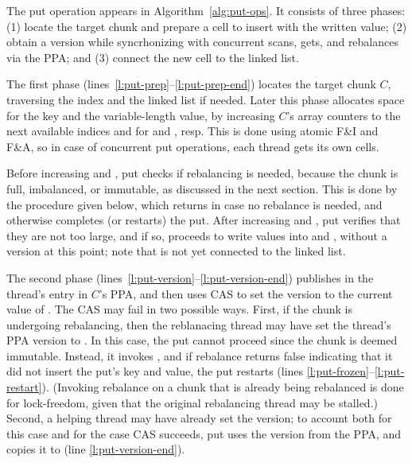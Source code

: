 The put operation appears in Algorithm~\ref{alg:put-ops}. It
consists of three phases: (1) locate the target chunk and
prepare a cell to insert with the written value; (2) obtain a version while syncrhonizing with
concurrent scans, gets, and rebalances via the PPA; and (3) connect  the new cell to the linked list.


The first phase (lines~\ref{l:put-prep}--\ref{l:put-prep-end})
locates the target chunk $C$, traversing the index and the linked list if needed. Later this phase allocates space for the key and the variable-length value, by increasing $C$'s array  counters to the next available indices  and  for  and , resp.
This is done using atomic F\&I and F\&A, so in case of concurrent put operations, each thread gets its own cells.

Before increasing  and , put checks if rebalancing is needed, because the chunk is full, imbalanced, or immutable, 
as discussed in the next section. This is done by the procedure  given below, 
which returns  in case no rebalance is needed, and otherwise completes (or restarts) the put.
After increasing  and , put verifies that they are not too large, 
and if so, proceeds to write values into  and , without a version at this point; note that  is not yet connected to the linked list.

The second phase (lines~\ref{l:put-version}--\ref{l:put-version-end}) publishes  in the thread's entry in $C$'s PPA,
and then uses CAS to set the version to the current value of .
The CAS may fail in two possible ways. First, if the chunk is undergoing rebalancing, then
the reblanacing thread may have set the thread's PPA version to .
In this case, the put cannot proceed since the chunk is deemed immutable. Instead, it invokes , 
and if rebalance returns false indicating that it did not insert the put's key and value, the put restarts
(lines \ref{l:put-frozen}--\ref{l:put-restart}).
(Invoking rebalance on a chunk that is already being rebalanced is done for lock-freedom, given that the original rebalancing thread
may be stalled.)
Second, a helping thread may have already set the version;
to account both for this case and for the case CAS succeeds,
put uses the version from the PPA, and copies it to  (line \ref{l:put-version-end}).

